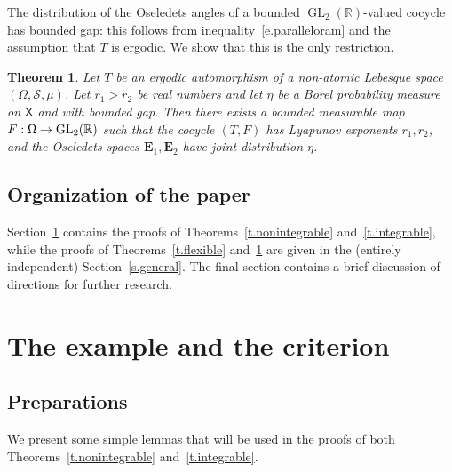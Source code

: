 \documentclass[10pt]{amsart}
\newtheorem{theo}{Theorem}[section]
\theoremstyle{definition}\newtheorem{defi}[theo]{Definition}\newtheorem{rema}[theo]{Remark}\newtheorem{exam}[theo]{Example}\newtheorem{exem}[theo]{Example}\newtheorem{nota}[theo]{Notation}
\newcommand{\R}{\mathbb{R}}
\newcommand{\E}{\mathbf{E}}
\newcommand{\sfX}{\mathsf{X}}
\newcommand{\clS}{\mathcal{S}}
\DeclareMathOperator{\GL}{GL}
\renewcommand*{\to}{\mathchoice{\longrightarrow}{\rightarrow}{\rightarrow}{\rightarrow}}
\begin{document}
The distribution of the Oseledets angles of a bounded $\GL_2(\R)$-valued cocycle has bounded gap: this follows from inequality~\eqref{e.paralleloram} and the assumption that $T$ is ergodic. We show that this is the only restriction.

\begin{theo}\label{t.boundedflexible}
Let $T$ be an ergodic automorphism of a non-atomic Lebesgue space $(\Omega,\clS,\mu)$. Let $r_1 > r_2$ be real numbers and let $\eta$ be a Borel probability measure on $\sfX$ and with bounded gap. Then there exists a bounded measurable map ${F:\Omega \to \GL_2(\R)}$ such that the cocycle $(T,F)$ has Lyapunov exponents $r_1,r_2$, and the Oseledets spaces $\E_1,\E_2$ have joint distribution $\eta$.
\end{theo}

\subsection{Organization of the paper}

Section~\ref{s.iid} contains the proofs of Theorems~\ref{t.nonintegrable} and~\ref{t.integrable}, while the proofs of Theorems~\ref{t.flexible} and~\ref{t.boundedflexible} are given in the (entirely independent) Section~\ref{s.general}. The final section contains a brief discussion of directions for further research.



\section{The example and the criterion}\label{s.iid}

\subsection{Preparations}

We present some simple lemmas that will be used in the proofs of both Theorems~\ref{t.nonintegrable} and~\ref{t.integrable}.
\end{document}
